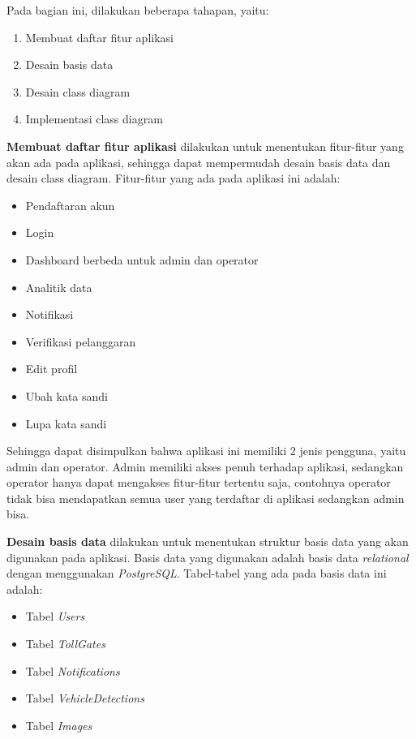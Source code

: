 Pada bagian ini, dilakukan beberapa tahapan, yaitu:
\begin{enumerate}[nolistsep]
  \item Membuat daftar fitur aplikasi
  \item Desain basis data
  \item Desain class diagram
  \item Implementasi class diagram
\end{enumerate}

\textbf{Membuat daftar fitur aplikasi} dilakukan untuk menentukan fitur-fitur yang akan ada pada aplikasi, sehingga dapat mempermudah desain basis data dan desain class diagram. Fitur-fitur yang ada pada aplikasi ini adalah:
\begin{itemize}[nolistsep]
  \item Pendaftaran akun
  \item Login
  \item Dashboard berbeda untuk admin dan operator
  \item Analitik data
  \item Notifikasi
  \item Verifikasi pelanggaran
  \item Edit profil
  \item Ubah kata sandi
  \item Lupa kata sandi
\end{itemize}

Sehingga dapat disimpulkan bahwa aplikasi ini memiliki 2 jenis pengguna, yaitu admin dan operator. Admin memiliki akses penuh terhadap aplikasi, sedangkan operator hanya dapat mengakses fitur-fitur tertentu saja, contohnya operator tidak bisa mendapatkan semua user yang terdaftar di aplikasi sedangkan admin bisa.

\textbf{Desain basis data} dilakukan untuk menentukan struktur basis data yang akan digunakan pada aplikasi. Basis data yang digunakan adalah basis data \emph{relational} dengan menggunakan \emph{PostgreSQL}. Tabel-tabel yang ada pada basis data ini adalah:
\begin{itemize}[nolistsep]
  \item Tabel \emph{Users}
  \item Tabel \emph{TollGates}
  \item Tabel \emph{Notifications}
  \item Tabel \emph{VehicleDetections}
  \item Tabel \emph{Images}
\end{itemize}

